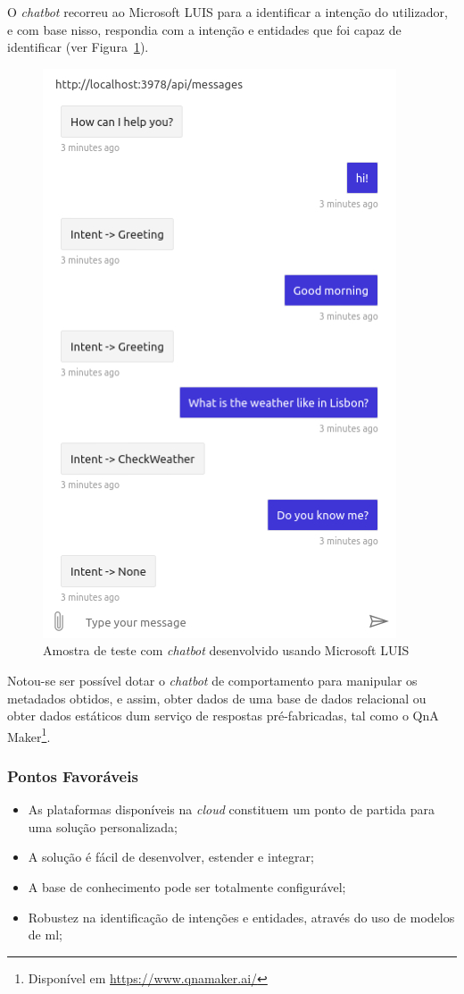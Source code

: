 O \textit{chatbot} recorreu ao Microsoft LUIS para a identificar a intenção do utilizador, e com base nisso, respondia com a intenção e entidades que foi capaz de identificar (ver Figura~\ref{fig:chatbotexample}). 
%
\begin{figure}
\centering
\includegraphics[width=.45\textwidth]{ch04/assets/chatbot.jpg}
\caption{Amostra de teste com \textit{chatbot} desenvolvido usando Microsoft LUIS}
\label{fig:chatbotexample}
\end{figure}
%
Notou-se ser possível dotar o \textit{chatbot} de comportamento para manipular os metadados obtidos, e assim, obter dados de uma base de dados relacional ou obter dados estáticos dum serviço de respostas pré-fabricadas, tal como o QnA Maker\footnote{Disponível em \url{https://www.qnamaker.ai/}}.

\subsubsection*{Pontos Favoráveis}
\begin{itemize}
    \item
    {
        As plataformas disponíveis na \textit{cloud} constituem um ponto de partida para uma solução personalizada;
    }
    \item
    {
        A solução é fácil de desenvolver, estender e integrar;
    }
    \item
    {
        A base de conhecimento pode ser totalmente configurável;
    }
    \item
    {
        Robustez na identificação de intenções e entidades, através do uso de modelos de \gls{ml};
    }
\end{itemize}

